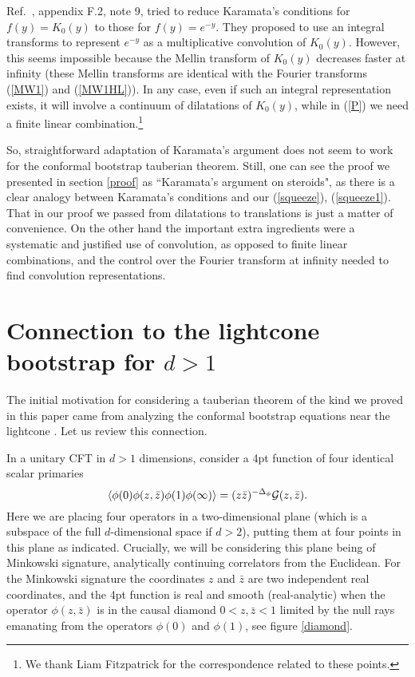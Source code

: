 \documentclass[12pt]{article}
\newcommand{\reef}[1]{(\ref{#1})}
\newcommand{\beq}{\begin{equation}}
\newcommand{\eeq}{\end{equation}}
\def\calG {{\cal G}}
\newcommand{\Df}{{\Delta_\phi}}
\numberwithin{equation}{section}
\begin{document}
Ref.~\cite{Fitzpatrick:2014vua}, appendix F.2, note 9, tried to reduce Karamata's conditions for $f(y)=K_0(y)$ to those for $f(y)=e^{-y}$. They proposed to use an integral transforms to represent $e^{-y}$ as a multiplicative convolution of $K_0(y)$. However, this seems impossible because the Mellin transform of $K_0(y)$ decreases faster at infinity (these Mellin transforms are identical with the Fourier transforms \reef{MW1} and \reef{MW1HL}). In any case, even if such an integral representation exists, it will involve a continuum of dilatations of $K_0(y)$, while in \reef{P} we need a finite linear combination.\footnote{We thank Liam Fitzpatrick for the correspondence related to these points.}%

So, straightforward adaptation of Karamata's argument does not seem to work for the conformal bootstrap tauberian theorem. Still, one can see the proof we presented in section \ref{proof} as ``Karamata's argument on steroids", as there is a clear analogy between Karamata's conditions and our (\ref{squeeze}), (\ref{squeeze1}). 
That in our proof we passed from dilatations to translations is just a matter of convenience. On the other hand the important extra ingredients were a systematic and justified use of convolution, as opposed to finite linear combinations, and the control over the Fourier transform at infinity needed to find convolution representations.

\section{Connection to the lightcone bootstrap for $d>1$}
\label{d>1}
The initial motivation for considering a tauberian theorem of the kind we proved in this paper came from analyzing the conformal bootstrap equations near the lightcone \cite{Fitzpatrick:2012yx,Komargodski:2012ek}. Let us review this connection. 

In a unitary CFT in $d>1$ dimensions, consider a 4pt function of four identical scalar primaries
\beq
\langle \phi(0) \phi(z,\bar z) \phi(1) \phi(\infty)\rangle = {(z \bar z)^{-\Df}} \calG(z,\bar z).
\eeq
Here we are placing four operators in a two-dimensional plane (which is a subspace of the full $d$-dimensional space if $d>2$), putting them at four points in this plane as indicated. Crucially, we will be considering this plane being of Minkowski signature, analytically continuing correlators from the Euclidean. For the Minkowski signature the coordinates $z$ and $\bar z$ are two independent real coordinates, and the 4pt function is real and smooth (real-analytic) when the operator $\phi(z,\bar z)$ is in the causal diamond $0<z,\bar z<1$ limited by the null rays emanating from the operators $\phi(0)$ and $\phi(1)$, see figure \ref{diamond}.
\end{document}
